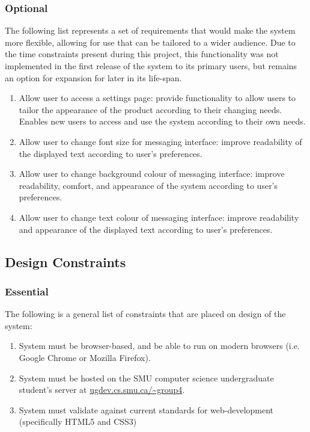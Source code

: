 \documentclass[11pt]{article}
\begin{document}
\subsubsection{Optional}
The following list represents a set of requirements that would make the system more flexible,
allowing for use that can be tailored to a wider audience. Due to the time constraints present
during this project, this functionality was not implemented in the first release of the system to
its primary users, but remains an option for expansion for later in its life-span.
\begin{enumerate}
    \item Allow user to access a settings page: provide functionality to allow users to tailor the
        appearance of the product according to their changing needs. Enables new users to access and
        use the system according to their own needs.
    \item Allow user to change font size for messaging interface: improve readability of the
        displayed text according to user's preferences.
    \item Allow user to change background colour of messaging interface: improve readability,
        comfort, and appearance of the system according to user's preferences.
    \item Allow user to change text colour of messaging interface: improve readability and
        appearance of the displayed text according to user's preferences.
\end{enumerate}

\subsection{Design Constraints}
\subsubsection{Essential}
The following is a general list of constraints that are placed on design of the system:
\begin{enumerate}
    \item System must be browser-based, and be able to run on modern browsers (i.e. Google Chrome or
        Mozilla Firefox).
    \item System must be hosted on the SMU computer science undergraduate student's server at
        \url{ugdev.cs.smu.ca/~group4}.
    \item System must validate against current standards for web-development (specifically HTML5 and
        CSS3)
\end{enumerate}
\end{document}
